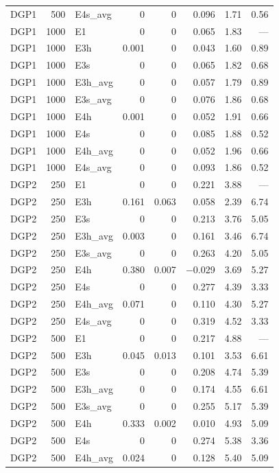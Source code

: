\begin{scriptsize}
\begin{longtable}{lrl*{5}{r}}
DGP1 & 500 & E4s\_avg & 0 & 0 & 0.096 & 1.71 & 0.56 \\
\addlinespace
DGP1 & 1000 & E1 & 0 & 0 & 0.065 & 1.83 & --- \\
DGP1 & 1000 & E3h & 0.001 & 0 & 0.043 & 1.60 & 0.89 \\
DGP1 & 1000 & E3s & 0 & 0 & 0.065 & 1.82 & 0.68 \\
DGP1 & 1000 & E3h\_avg & 0 & 0 & 0.057 & 1.79 & 0.89 \\
DGP1 & 1000 & E3s\_avg & 0 & 0 & 0.076 & 1.86 & 0.68 \\
DGP1 & 1000 & E4h & 0.001 & 0 & 0.052 & 1.91 & 0.66 \\
DGP1 & 1000 & E4s & 0 & 0 & 0.085 & 1.88 & 0.52 \\
DGP1 & 1000 & E4h\_avg & 0 & 0 & 0.052 & 1.96 & 0.66 \\
DGP1 & 1000 & E4s\_avg & 0 & 0 & 0.093 & 1.86 & 0.52 \\
\addlinespace\midrule\addlinespace
DGP2 & 250 & E1 & 0 & 0 & 0.221 & 3.88 & --- \\
DGP2 & 250 & E3h & 0.161 & 0.063 & 0.058 & 2.39 & 6.74 \\
DGP2 & 250 & E3s & 0 & 0 & 0.213 & 3.76 & 5.05 \\
DGP2 & 250 & E3h\_avg & 0.003 & 0 & 0.161 & 3.46 & 6.74 \\
DGP2 & 250 & E3s\_avg & 0 & 0 & 0.263 & 4.20 & 5.05 \\
DGP2 & 250 & E4h & 0.380 & 0.007 & $-$0.029 & 3.69 & 5.27 \\
DGP2 & 250 & E4s & 0 & 0 & 0.277 & 4.39 & 3.33 \\
DGP2 & 250 & E4h\_avg & 0.071 & 0 & 0.110 & 4.30 & 5.27 \\
DGP2 & 250 & E4s\_avg & 0 & 0 & 0.319 & 4.52 & 3.33 \\
\addlinespace
DGP2 & 500 & E1 & 0 & 0 & 0.217 & 4.88 & --- \\
DGP2 & 500 & E3h & 0.045 & 0.013 & 0.101 & 3.53 & 6.61 \\
DGP2 & 500 & E3s & 0 & 0 & 0.208 & 4.74 & 5.39 \\
DGP2 & 500 & E3h\_avg & 0 & 0 & 0.174 & 4.55 & 6.61 \\
DGP2 & 500 & E3s\_avg & 0 & 0 & 0.255 & 5.17 & 5.39 \\
DGP2 & 500 & E4h & 0.333 & 0.002 & 0.010 & 4.93 & 5.09 \\
DGP2 & 500 & E4s & 0 & 0 & 0.274 & 5.38 & 3.36 \\
DGP2 & 500 & E4h\_avg & 0.024 & 0 & 0.128 & 5.40 & 5.09 \\

\end{longtable}
\end{scriptsize}
